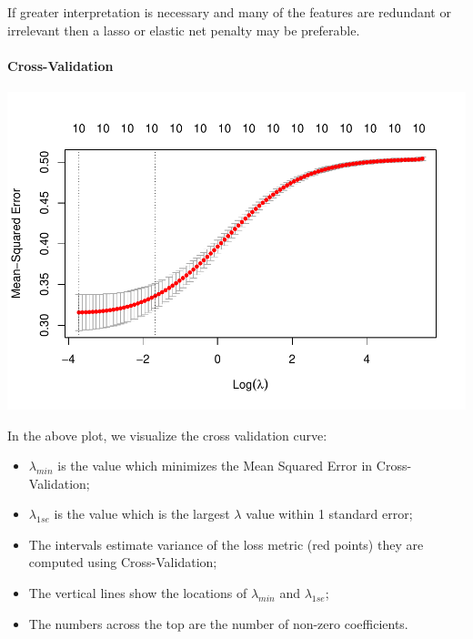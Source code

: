 \documentclass[
]{article}
\newenvironment{Shaded}{\begin{snugshade}}{\end{snugshade}}
\newcommand{\AttributeTok}[1]{\textcolor[rgb]{0.77,0.63,0.00}{#1}}
\newcommand{\DecValTok}[1]{\textcolor[rgb]{0.00,0.00,0.81}{#1}}
\newcommand{\FunctionTok}[1]{\textcolor[rgb]{0.00,0.00,0.00}{#1}}
\newcommand{\NormalTok}[1]{#1}
\newcommand{\OtherTok}[1]{\textcolor[rgb]{0.56,0.35,0.01}{#1}}
\newcommand{\SpecialCharTok}[1]{\textcolor[rgb]{0.00,0.00,0.00}{#1}}
\newcommand{\StringTok}[1]{\textcolor[rgb]{0.31,0.60,0.02}{#1}}
\begin{document}
If greater interpretation is necessary and many of the features are
redundant or irrelevant then a lasso or elastic net penalty may be
preferable.

\hypertarget{cross-validation}{%
\paragraph{Cross-Validation}\label{cross-validation}}

\begin{Shaded}
\end{Shaded}

\begin{center}\includegraphics{TP3_MERR_HABBOU_KHIDOUR_files/figure-latex/unnamed-chunk-32-1} \end{center}

In the above plot, we visualize the cross validation curve:

\begin{itemize}
\item
  \(\lambda_{min}\) is the value which minimizes the Mean Squared Error
  in Cross-Validation;
\item
  \(\lambda_{1se}\) is the value which is the largest \(\lambda\) value
  within 1 standard error;
\item
  The intervals estimate variance of the loss metric (red points) they
  are computed using Cross-Validation;
\item
  The vertical lines show the locations of \(\lambda_{min}\) and
  \(\lambda_{1se}\);
\item
  The numbers across the top are the number of non-zero coefficients.
\end{itemize}
\end{document}
